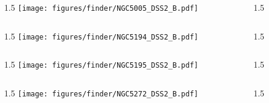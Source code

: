 \documentclass[final]{beamer}
\newlength{\colwidth}
\begin{document}

\begin{frame}[t]{}
  \begin{columns}[T]
    \begin{column}{1.5\colwidth}
      \centering
      \texttt{[image: figures/finder/NGC5005\_DSS2\_B.pdf]}
    \end{column}
    \begin{column}{1.5\colwidth}
      \Large
      
    \end{column}
  \end{columns}
  \vspace{\fill}
  \begin{columns}[T]
    \begin{column}{1.5\colwidth}
      \centering
      \texttt{[image: figures/finder/NGC5194\_DSS2\_B.pdf]}
    \end{column}
    \begin{column}{1.5\colwidth}
      \Large
      
    \end{column}
  \end{columns}
\end{frame}


\begin{frame}[t]{}
  \begin{columns}[T]
    \begin{column}{1.5\colwidth}
      \centering
      \texttt{[image: figures/finder/NGC5195\_DSS2\_B.pdf]}
    \end{column}
    \begin{column}{1.5\colwidth}
      \Large
      
    \end{column}
  \end{columns}
  \vspace{\fill}
  \begin{columns}[T]
    \begin{column}{1.5\colwidth}
      \centering
      \texttt{[image: figures/finder/NGC5272\_DSS2\_B.pdf]}
    \end{column}
    \begin{column}{1.5\colwidth}
      \Large
      
    \end{column}
  \end{columns}
\end{frame}
\end{document}
